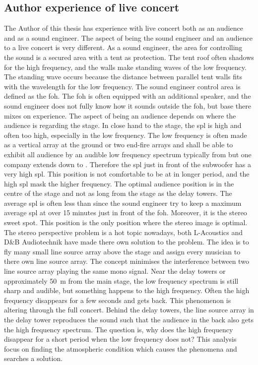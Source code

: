 \subsection{Author experience of live concert}\label{sec:ana:aut_exp_con}
The Author of this thesis has experience with live concert both as an audience and as a sound engineer. The aspect of being the sound engineer and an audience to a live concert is very different. As a sound engineer, the area for controlling the sound is a secured area with a tent as protection. The tent roof often shadows for the high frequency, and the walls make standing waves of the low frequency.  The standing wave occurs because the distance between parallel tent walls fits with the wavelength for the low frequency. The sound engineer control area is defined as the \gls{foh}. The \gls{foh} is often equipped with an additional speaker, and the sound engineer does not fully know how it sounds outside the \gls{foh}, but base there mixes on experience. The aspect of being an audience depends on where the audience is regarding the stage. In close hand to the stage, the \gls{spl} is high and often too high, especially in the low frequency. The low frequency is often made as a vertical array at the ground or two end-fire arrays and shall be able to exhibit all audience by an audible low frequency spectrum typically from  but one company extends down to . Therefore the \gls{spl} just in front of the subwoofer has a very high \gls{spl}. This position is not comfortable to be at in longer period, and the high \gls{spl} mask the higher frequency. The optimal audience position is in the centre of the stage and not as long from the stage as the delay towers. The average \gls{spl} is often less than  since the sound engineer try to keep a maximum average \gls{spl} at  over 15 minutes just in front of the \gls{foh}. Moreover, it is the stereo sweet spot. This position is the only position where the stereo image is optimal. The stereo perspective problem is a hot topic nowadays, both L-Acoustics \citep{l_acoustics_l_isa} and D\&B Audiotechnik \citep{dbsoundscape} have made there own solution to the problem. The idea is to fly many small line source array above the stage and assign every musician to there own line source array. The concept minimises the interference between two line source array playing the same mono signal. 
Near the delay towers or approximately \SI{50}{\meter} from the main stage, the low frequency spectrum is still sharp and audible, but something happens to the high frequency. Often the high frequency disappears for a few seconds and gets back. This phenomenon is altering through the full concert. Behind the delay towers, the line source array in the delay tower reproduces the sound such that the audience in the back also gets the high frequency spectrum. The question is, why does the high frequency disappear for a short period when the low frequency does not? This analysis focus on finding the atmospheric condition which causes the phenomena and searches a solution.


 
